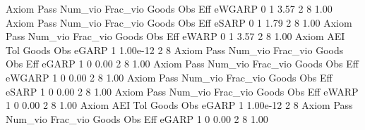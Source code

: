 {\smallskip}
       Axiom {\VBAR} Pass     Num_vio    Frac_vio       Goods         Obs         Eff  
      eWGARP {\VBAR}    0           1        3.57           2           8        1.00  
{\smallskip}
{\smallskip}
{\smallskip}
       Axiom {\VBAR} Pass     Num_vio    Frac_vio       Goods         Obs         Eff  
       eSARP {\VBAR}    0           1        1.79           2           8        1.00  
{\smallskip}
{\smallskip}
{\smallskip}
       Axiom {\VBAR} Pass     Num_vio    Frac_vio       Goods         Obs         Eff  
       eWARP {\VBAR}    0           1        3.57           2           8        1.00  
{\smallskip}
       Axiom {\VBAR}       AEI        Tol      Goods        Obs 
       eGARP {\VBAR}         1   1.00e-12          2          8 
{\smallskip}
{\smallskip}
{\smallskip}
       Axiom {\VBAR} Pass     Num_vio    Frac_vio       Goods         Obs         Eff  
       eGARP {\VBAR}    1           0        0.00           2           8        1.00  
{\smallskip}
{\smallskip}
{\smallskip}
       Axiom {\VBAR} Pass     Num_vio    Frac_vio       Goods         Obs         Eff  
      eWGARP {\VBAR}    1           0        0.00           2           8        1.00  
{\smallskip}
{\smallskip}
{\smallskip}
       Axiom {\VBAR} Pass     Num_vio    Frac_vio       Goods         Obs         Eff  
       eSARP {\VBAR}    1           0        0.00           2           8        1.00  
{\smallskip}
{\smallskip}
{\smallskip}
       Axiom {\VBAR} Pass     Num_vio    Frac_vio       Goods         Obs         Eff  
       eWARP {\VBAR}    1           0        0.00           2           8        1.00  
{\smallskip}
       Axiom {\VBAR}       AEI        Tol      Goods        Obs 
       eGARP {\VBAR}         1   1.00e-12          2          8 
{\smallskip}
{\smallskip}
{\smallskip}
       Axiom {\VBAR} Pass     Num_vio    Frac_vio       Goods         Obs         Eff  
       eGARP {\VBAR}    1           0        0.00           2           8        1.00  
